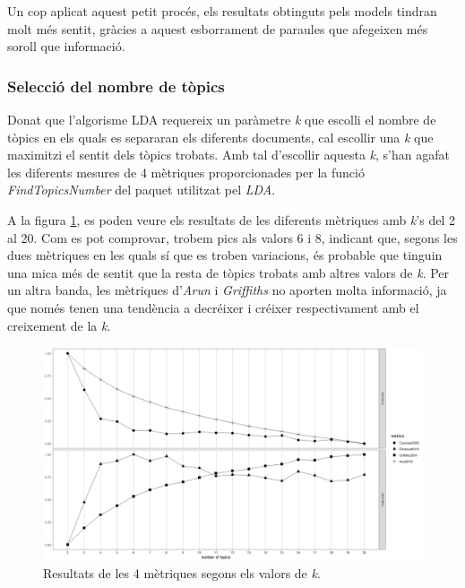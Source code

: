 Un cop aplicat aquest petit procés, els resultats obtinguts pels models tindran molt més sentit, gràcies a aquest esborrament de paraules que afegeixen més soroll que informació.

\newpage

\subsubsection{Selecció del nombre de tòpics}
Donat que l'algorisme LDA requereix un paràmetre \textit{k} que escolli el nombre de tòpics en els quals es separaran els diferents documents, cal escollir una \textit{k} que maximitzi el sentit dels tòpics trobats. Amb tal d'escollir aquesta \textit{k}, s'han agafat les diferents mesures de 4 mètriques proporcionades per la funció \textit{FindTopicsNumber} del paquet utilitzat pel \textit{LDA}.

A la figura \ref{fig:8_LDA:lda_finetunning}, es poden veure els resultats de les diferents mètriques amb \textit{k}'s del 2 al 20. Com es pot comprovar, trobem pics als valors 6 i 8, indicant que, segons les dues mètriques en les quals sí que es troben variacions, és probable que tinguin una mica més de sentit que la resta de tòpics trobats amb altres valors de \textit{k}. Per un altra banda, les mètriques d'\textit{Arun} i \textit{Griffiths} no aporten molta informació, ja que només tenen una tendència a decréixer i créixer respectivament amb el creixement de la \textit{k}.

\begin{figure}[H]
    \centering
    \includegraphics[width=0.7\linewidth]{Images/8_Textual/LDA/lda_finetunning.png}
    \caption{Resultats de les 4 mètriques segons els valors de \textit{k}.}
    \label{fig:8_LDA:lda_finetunning}
\end{figure}

